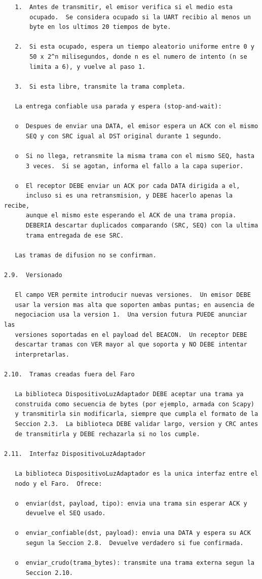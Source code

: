 \newpage
\begin{Verbatim}
   1.  Antes de transmitir, el emisor verifica si el medio esta
       ocupado.  Se considera ocupado si la UART recibio al menos un
       byte en los ultimos 20 tiempos de byte.

   2.  Si esta ocupado, espera un tiempo aleatorio uniforme entre 0 y
       50 x 2^n milisegundos, donde n es el numero de intento (n se
       limita a 6), y vuelve al paso 1.

   3.  Si esta libre, transmite la trama completa.

   La entrega confiable usa parada y espera (stop-and-wait):

   o  Despues de enviar una DATA, el emisor espera un ACK con el mismo
      SEQ y con SRC igual al DST original durante 1 segundo.

   o  Si no llega, retransmite la misma trama con el mismo SEQ, hasta
      3 veces.  Si se agotan, informa el fallo a la capa superior.

   o  El receptor DEBE enviar un ACK por cada DATA dirigida a el,
      incluso si es una retransmision, y DEBE hacerlo apenas la recibe,
      aunque el mismo este esperando el ACK de una trama propia.
      DEBERIA descartar duplicados comparando (SRC, SEQ) con la ultima
      trama entregada de ese SRC.

   Las tramas de difusion no se confirman.

2.9.  Versionado

   El campo VER permite introducir nuevas versiones.  Un emisor DEBE
   usar la version mas alta que soporten ambas puntas; en ausencia de
   negociacion usa la version 1.  Una version futura PUEDE anunciar las
   versiones soportadas en el payload del BEACON.  Un receptor DEBE
   descartar tramas con VER mayor al que soporta y NO DEBE intentar
   interpretarlas.

2.10.  Tramas creadas fuera del Faro

   La biblioteca DispositivoLuzAdaptador DEBE aceptar una trama ya
   construida como secuencia de bytes (por ejemplo, armada con Scapy)
   y transmitirla sin modificarla, siempre que cumpla el formato de la
   Seccion 2.3.  La biblioteca DEBE validar largo, version y CRC antes
   de transmitirla y DEBE rechazarla si no los cumple.

2.11.  Interfaz DispositivoLuzAdaptador

   La biblioteca DispositivoLuzAdaptador es la unica interfaz entre el
   nodo y el Faro.  Ofrece:

   o  enviar(dst, payload, tipo): envia una trama sin esperar ACK y
      devuelve el SEQ usado.

   o  enviar_confiable(dst, payload): envia una DATA y espera su ACK
      segun la Seccion 2.8.  Devuelve verdadero si fue confirmada.

   o  enviar_crudo(trama_bytes): transmite una trama externa segun la
      Seccion 2.10.
\end{Verbatim}
